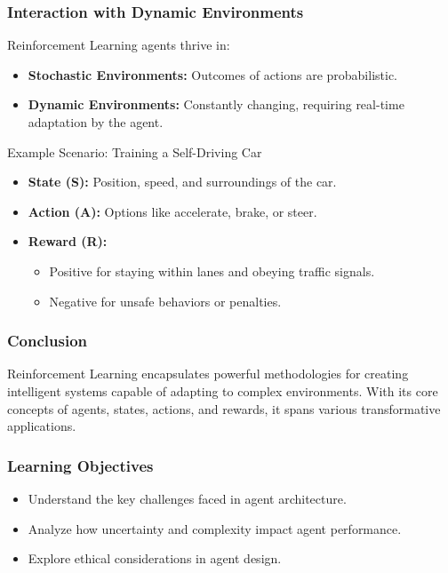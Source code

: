 \documentclass[aspectratio=169]{beamer}
\begin{document}
\begin{frame}[fragile]
    \frametitle{Interaction with Dynamic Environments}
    Reinforcement Learning agents thrive in:
    \begin{itemize}
        \item \textbf{Stochastic Environments:} Outcomes of actions are probabilistic.
        \item \textbf{Dynamic Environments:} Constantly changing, requiring real-time adaptation by the agent.
    \end{itemize}
    \begin{block}{Example Scenario: Training a Self-Driving Car}
        \begin{itemize}
            \item \textbf{State (S):} Position, speed, and surroundings of the car.
            \item \textbf{Action (A):} Options like accelerate, brake, or steer.
            \item \textbf{Reward (R):} 
                \begin{itemize}
                    \item Positive for staying within lanes and obeying traffic signals.
                    \item Negative for unsafe behaviors or penalties.
                \end{itemize}
        \end{itemize}
    \end{block}
\end{frame}

\begin{frame}[fragile]
    \frametitle{Conclusion}
    Reinforcement Learning encapsulates powerful methodologies for creating intelligent systems capable of adapting to complex environments. With its core concepts of agents, states, actions, and rewards, it spans various transformative applications.
\end{frame}

\begin{frame}[fragile]
    \frametitle{Learning Objectives}
    \begin{itemize}
        \item Understand the key challenges faced in agent architecture.
        \item Analyze how uncertainty and complexity impact agent performance.
        \item Explore ethical considerations in agent design.
    \end{itemize}
\end{frame}
\end{document}

